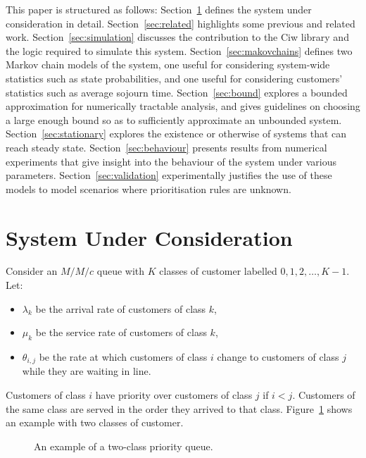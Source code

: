 \documentclass{article}
\begin{document}
This paper is structured as follows:
Section~\ref{sec:system} defines the system under consideration in detail.
Section~\ref{sec:related} highlights some previous and related work.
Section~\ref{sec:simulation} discusses the contribution to the Ciw library and
the logic required to simulate this system.
Section~\ref{sec:makovchains} defines two Markov chain models of the system, one
useful for considering system-wide statistics such as state probabilities, and
one useful for considering customers' statistics such as average sojourn time.
Section~\ref{sec:bound} explores a bounded approximation for numerically
tractable analysis, and gives guidelines on choosing a large enough bound so as
to sufficiently approximate an unbounded system.
Section~\ref{sec:stationary} explores the existence or otherwise of systems that
can reach steady state.
Section~\ref{sec:behaviour} presents results from numerical experiments that
give insight into the behaviour of the system under various parameters.
Section~\ref{sec:validation} experimentally justifies the use of these models
to model scenarios where prioritisation rules are unknown.





\section{System Under Consideration}\label{sec:system}
Consider an $M/M/c$ queue with $K$ classes of customer labelled
$0, 1, 2, \dots, K-1$.
Let:

\begin{itemize}
  \item $\lambda_k$ be the arrival rate of customers of class $k$,
  \item $\mu_k$ be the service rate of customers of class $k$,
  \item $\theta_{i,j}$ be the rate at which customers of class $i$ change
  to customers of class $j$ while they are waiting in line.
\end{itemize}

Customers of class $i$ have priority over customers of class $j$ if $i < j$.
Customers of the same class are served in the order they arrived to that class.
Figure~\ref{fig:twoclass_example} shows an example with two classes of customer.

\begin{figure}
\begin{center}

\end{center}
\caption{An example of a two-class priority queue.}
\label{fig:twoclass_example}
\end{figure}
\end{document}
